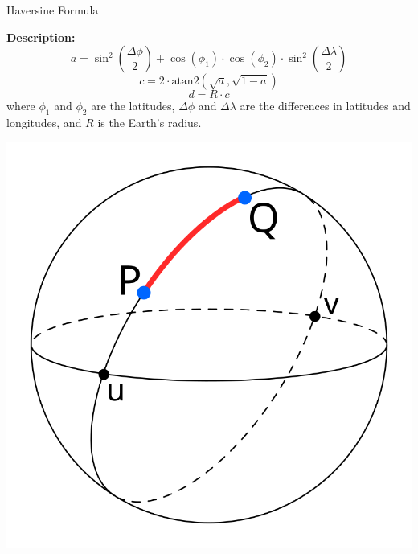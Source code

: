 \documentclass[aspectratio=169,xcolor=dvipsnames]{beamer}
\begin{document}
\begin{frame}{Haversine Formula}
    \begin{minipage}[t]{0.5\textwidth}
        \vspace{-3cm} 
        \textbf{Description:} \\
        \vspace{0.1cm} %
        \[
        a = \sin^2\left(\frac{\Delta \phi}{2}\right) + \cos(\phi_1) \cdot \cos(\phi_2) \cdot \sin^2\left(\frac{\Delta \lambda}{2}\right)
        \]
        \[
        c = 2 \cdot \text{atan2}\left(\sqrt{a}, \sqrt{1-a}\right)
        \]
        \[
        d = R \cdot c
        \]
        where \( \phi_1 \) and \( \phi_2 \) are the latitudes, \( \Delta \phi \) and \( \Delta \lambda \) are the differences in latitudes and longitudes, and \( R \) is the Earth's radius.
    \end{minipage}
    \hfill
    \begin{minipage}{0.45\textwidth}
        \centering
        \includegraphics[width=\textwidth]{images/Illustration_of_great-circle_distance.svg.png} 
    \end{minipage}
\end{frame}

\end{document}
